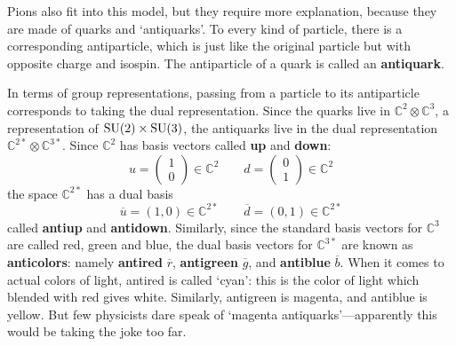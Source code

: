 \documentclass{article}
\newcommand{\C}{{\mathbb C}}  %
\newcommand{\SU}{{\rm SU}}    %
\newcommand{\ubar}{\overline{u}} %
\newcommand{\dbar}{\overline{d}} %
\newcommand{\rbar}{{\overline{r}}} %
\newcommand{\gbar}{{\overline{g}}} %
\newcommand{\bbar}{{\overline{b}}} %
\begin{document}
Pions also fit into this model, but they require more explanation, because they
are made of quarks and `antiquarks'. To every kind of particle, there is a
corresponding antiparticle, which is just like the original particle but with
opposite charge and isospin.   The antiparticle of a quark is called an
\textbf{antiquark}.

In terms of group representations, passing from a particle to its 
antiparticle corresponds to taking the dual representation.  
Since the quarks live in $\C^2 \otimes \C^3$, a representation 
of $\SU(2) \times \SU(3)$, the antiquarks live in the dual 
representation $\C^{2*} \otimes \C^{3*}$.  
Since $\C^2$ has basis vectors called {\bf up} and {\bf down}:
\[  
u = \left( \begin{array}{c} 1 \\ 0 \end{array} \right) \in \C^2  \qquad
d = \left( \begin{array}{c} 0 \\ 1 \end{array} \right) \in \C^2
\]
the space $\C^{2*}$ has a dual basis
\[	\ubar = \left( 1, 0 \right) \in \C^{2*}	 \qquad
        \dbar = \left( 0, 1 \right) \in \C^{2*}	\]
called \textbf{antiup} and \textbf{antidown}.  Similarly, since the
standard basis vectors for $\C^3$ are called red, green and blue, 
the dual basis vectors for $\C^{3*}$ are known as \textbf{anticolors}: namely
\textbf{antired} $\rbar$, \textbf{antigreen} $\gbar$, and \textbf{antiblue} 
$\bbar$.  When it comes to actual colors of light, antired is 
called `cyan': this is the color of light which blended with red gives
white.  Similarly, antigreen is magenta, and antiblue is yellow.  But 
few physicists dare speak of `magenta antiquarks'---apparently this
would be taking the joke too far.
\end{document}

